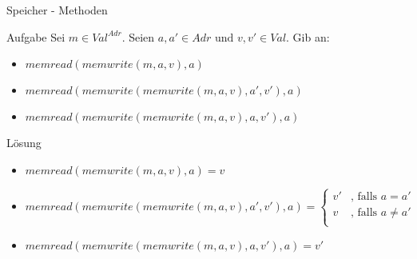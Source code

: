 
\begin{frame}{Speicher - Methoden}
	\begin{exampleblock}{Aufgabe}		
		Sei $m \in Val^{Adr}$. Seien $ a,a' \in Adr \text{ und } v,v' \in Val$. Gib an: \\
		\begin{itemize}
			\item $memread(memwrite(m,a,v),a)$
			\item $memread(memwrite(memwrite(m,a,v),a',v'),a)$
			\item $memread(memwrite(memwrite(m,a,v),a,v'),a)$
		\end{itemize}
	\end{exampleblock}
	\pause
	\begin{block}{Lösung}
	\small
		\begin{itemize}
			\item $memread(memwrite(m,a,v),a) = v$
			\item $memread(memwrite(memwrite(m,a,v),a',v'),a) = \begin{cases}
																	v' & \text{, falls } a = a' \\
																	v  & \text{, falls } a \neq a' \\
																\end{cases}$
			\item $memread(memwrite(memwrite(m,a,v),a,v'),a) = v' $
		\end{itemize}
	\end{block}
\end{frame}